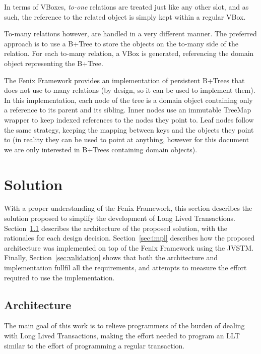 \documentclass{llncs}
\begin{document}
In terms of VBoxes, {\it to-one} relations are treated just like any
other slot, and as such, the reference to the related object is simply
kept within a regular VBox.

To-many relations however, are handled in a very different manner. The
preferred approach is to use a B+Tree \cite{elmasri2009fundamentals}
to store the objects on the to-many side of the relation. For each
to-many relation, a VBox is generated, referencing the domain object
representing the B+Tree.

The Fenix Framework provides an implementation of persistent B+Trees
that does not use to-many relations (by design, so it can be used to
implement them). In this implementation, each node of the tree is a
domain object containing only a reference to its parent and its
sibling. Inner nodes use an immutable TreeMap wrapper to keep indexed
references to the nodes they point to. Leaf nodes follow the same
strategy, keeping the mapping between keys and the objects they point
to (in reality they can be used to point at anything, however for this
document we are only interested in B+Trees containing domain objects).


\section{Solution}
\label{chap:solution}

With a proper understanding of the Fenix Framework, this section
describes the solution proposed to simplify the development of Long
Lived Transactions. Section~\ref{sec:arch} describes the architecture
of the proposed solution, with the rationales for each design
decision. Section~\ref{sec:impl} describes how the proposed
architecture was implemented on top of the Fenix Framework using the
JVSTM. Finally, Section~\ref{sec:validation} shows that both the
architecture and implementation fullfil all the requirements, and
attempts to measure the effort required to use the implementation.

\subsection{Architecture}
\label{sec:arch}

The main goal of this work is to relieve programmers of the burden of
dealing with Long Lived Transactions, making the effort needed to
program an LLT similar to the effort of programming a regular
transaction.
\end{document}
